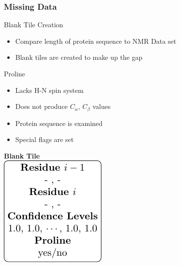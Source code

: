 \documentclass{beamer}
\begin{document}
\begin{frame}
	\frametitle{Missing Data}
	\begin{minipage}{0.45\textwidth}
		\begin{block}{Blank Tile Creation}
			\begin{itemize}
				\item Compare length of protein sequence to NMR Data set
				\item Blank tiles are created to make up the gap
			\end{itemize}
		\end{block}
		\begin{block}{Proline}
			\begin{itemize}
				\item Lacks H-N spin system
				\item Does not produce $C_{\alpha}$, $C_{\beta}$ values
				\item Protein sequence is examined
				\item Special flags are set 
			\end{itemize}
		\end{block}
	\end{minipage}
	\begin{minipage}{0.15\textwidth}


	\end{minipage}
	\begin{minipage}{0.45\textwidth}
	\begin{center}
		\huge\textbf{Blank Tile}\\
		\vspace {12pt}
		\includegraphics[width=\textwidth]{tile_fig_blank}
	\end{center}
	\end{minipage}
\end{frame}
\end{document}
